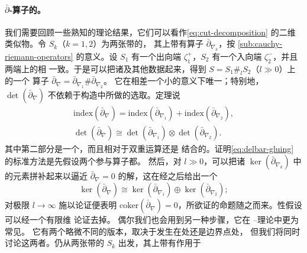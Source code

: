 \paragraph{\texorpdfstring{$\bar{\partial}$}{dbar}-算子的\trDeterminantLine。}%
\label{sub:determinant-lines-delbar}
我们需要回顾一些熟知的\trIndex{}理论结果，它们可以看作\eqref{eq:cut-decomposition}
的二维类似物。令 $S_k$（$k=1,2$）为两张带\trStriplikeEnd{}的\trRiemann\trSurface，
其上带有\trCauchyRiemann{}算子 $\bar{\partial}_{\nabla_k}$，按
\cref{sub:cauchy-riemann-operators} 的意义\trNondegenerate。设 $S_1$ 有一个出向端
$\zeta_1^{+}$，$S_2$ 有一个入向端 $\zeta_2^{-}$，并且两端上的\trLimitingDatum{}相
一致。于是可以把诸\trVectorBundle{}及其他数据\trGluing{}起来，得到\trSurface
$S=S_1\#_l S_2$（$l\gg 0$）上的一个\trNondegenerate{} \trCauchyRiemann{}算子
$\bar{\partial}_{\nabla}=\bar{\partial}_{\nabla_1}\#\bar{\partial}_{\nabla_2}$。
它在相差一个小\trPerturbation{}的意义下唯一；特别地，\trDeterminantLine{}
$\det(\bar{\partial}_{\nabla})$ 不依赖于构造中所做的选取。\trGluing{}定理说
\begin{equation}\label{eq:delbar-gluing}
\begin{gathered}
\mathrm{index}(\bar{\partial}_{\nabla})=\mathrm{index}(\bar{\partial}_{\nabla_1})+
\mathrm{index}(\bar{\partial}_{\nabla_2}),\\
\det(\bar{\partial}_{\nabla})\cong\det(\bar{\partial}_{\nabla_1})\otimes
\det(\bar{\partial}_{\nabla_2}).
\end{gathered}
\end{equation}
其中第二部分是一个\trCanonical{}\trIsomorphism，而且相对于双重\trGluing{}运算还是
结合的。证明\eqref{eq:delbar-gluing} 的标准方法是先假设两个参与算子都\trSurjective。
然后，对 $l\gg 0$，可以把诸 $\ker(\bar{\partial}_{\nabla_k})$ 中的元素拼补起来以逼近
$\bar{\partial}_{\nabla}=0$ 的解，这在经\trOrthogonal\trProjection{}之后给出一个%
\trIsomorphism
\begin{equation}\label{eq:delbar-kernel-iso}
\ker(\bar{\partial}_{\nabla})\cong\ker(\bar{\partial}_{\nabla_1})\oplus
\ker(\bar{\partial}_{\nabla_2});
\end{equation}
对极限 $l\to\infty$ 施以\trCompactness{}论证便表明 $\mathrm{coker}(\bar{\partial}_
{\nabla})=0$，所欲证的命题随之而来。\trSurjective{}性假设可以经一个有限维%
\trStabilization{}论证去掉。
偶尔我们也会用到另一种\trGluing{}步骤，它在 \trGromov--\trWitten{}理论中更为常见。
它有两个略微不同的版本，取决于\trGluing{}发生在\trInteriorPoint{}处还是边界点处，
但我们将同时讨论这两者。仍从两张带\trStriplikeEnd{}的\trSurface{} $S_k$ 出发，其上带有作用于%
